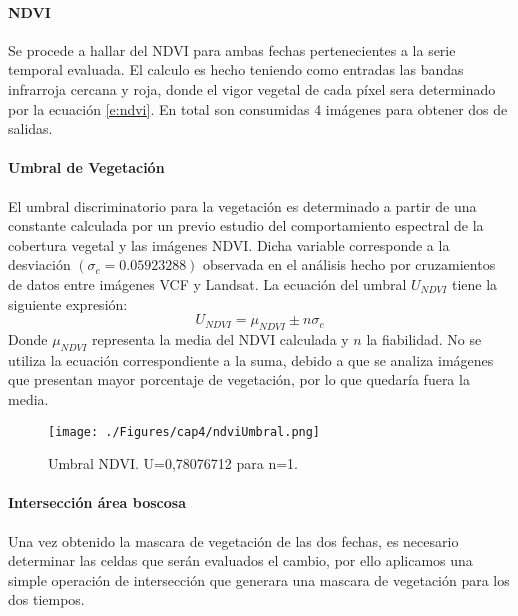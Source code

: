 \paragraph{NDVI}
Se procede a hallar del NDVI para ambas fechas pertenecientes a la serie temporal evaluada. El calculo es hecho teniendo como entradas las bandas infrarroja cercana y roja, donde el vigor vegetal de cada p\'ixel sera determinado por la ecuaci\'on \ref{e:ndvi}. En total son consumidas 4 im\'agenes para obtener dos de salidas.
\paragraph{Umbral de Vegetaci\'on}\label{sec:uvegetacion}
El umbral discriminatorio para la vegetaci\'on es determinado a partir de una constante calculada por un previo estudio del comportamiento espectral de la cobertura vegetal y las im\'agenes NDVI. Dicha variable corresponde a la desviaci\'on $(\sigma_{c} = 0.05923288)  $ observada en el an\'alisis hecho por cruzamientos de datos entre im\'agenes VCF y Landsat. La ecuaci\'on del umbral $ U_{NDVI} $ tiene la siguiente expresi\'on:
		\begin{equation}
		U_{NDVI} = \mu_{NDVI}\pm n \sigma_{c}
		\end{equation}
Donde $ \mu_{NDVI} $ representa la media del NDVI calculada y $ n $ la fiabilidad. No se utiliza la ecuaci\'on correspondiente a la suma, debido a que se analiza im\'agenes que presentan mayor porcentaje de vegetaci\'on, por lo que quedaría fuera la media.
\begin{figure}[H]
	\centering
	\texttt{[image: ./Figures/cap4/ndviUmbral.png]}
	\caption{Umbral NDVI. U=0,78076712 para n=1.}
	\label{fig:ndviUmbral}
\end{figure}

\paragraph{Intersecci\'on \'area boscosa }
Una vez obtenido la mascara de vegetaci\'on de las dos fechas, es necesario determinar las celdas que ser\'an evaluados el cambio, por ello aplicamos una simple operaci\'on de intersecci\'on que generara una mascara de vegetaci\'on para los dos tiempos.

